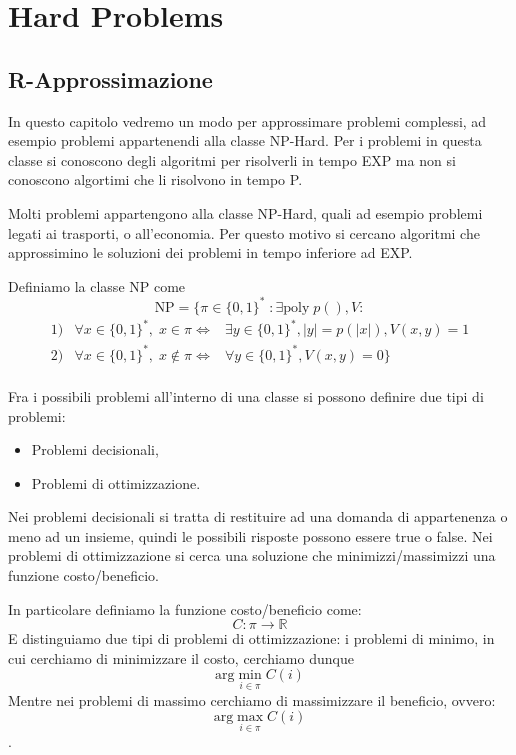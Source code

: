 \documentclass[a4paper,11pt]{book}
\begin{document}

\part{Hard Problems}

\chapter{R-Approssimazione}

In questo capitolo vedremo un modo per approssimare problemi complessi, ad esempio problemi appartenendi alla classe \textsf{NP-Hard}. Per i problemi in questa classe si conoscono degli algoritmi per risolverli in tempo \textsf{EXP} ma non si conoscono algortimi che li risolvono in tempo \textsf{P}.

Molti problemi appartengono alla classe \textsf{NP-Hard}, quali ad esempio problemi legati ai trasporti, o all'economia. Per questo motivo si cercano algoritmi che approssimino le soluzioni dei problemi in tempo inferiore ad \textsf{EXP}.

Definiamo la classe \textsf{NP} come $$\mbox{NP} = \{ \pi \in \{0,1\}^* \; : \exists \mbox{poly} \; p(), V : $$
\begin{eqnarray}
1) & \forall x \in \{0,1\}^*, \;  x \in \pi \Leftrightarrow & \exists y \in \{0,1\}^*, |y| = p(|x|), V(x,y) = 1 \nonumber \\
2) & \forall x \in \{0,1\}^*, \;  x \not\in \pi \Leftrightarrow & \forall y \in \{0,1\}^*, V(x,y) = 0 \nonumber \} \\
\end{eqnarray}

Fra i possibili problemi all'interno di una classe si possono definire due tipi di problemi:
\begin{itemize}
\item Problemi decisionali,
\item Problemi di ottimizzazione.
\end{itemize}

Nei problemi decisionali si tratta di restituire ad una domanda di appartenenza o meno ad un insieme, quindi le possibili risposte possono essere \textsf{true} o \textsf{false}. Nei problemi di ottimizzazione si cerca una soluzione che minimizzi/massimizzi una funzione costo/beneficio.

In particolare definiamo la funzione costo/beneficio come: $$C : \pi \rightarrow \mathbb{R}$$ E distinguiamo due tipi di problemi di ottimizzazione: i problemi di minimo, in cui cerchiamo di minimizzare il costo, cerchiamo dunque $$\mbox{arg} \min_{i \in \pi} C(i)$$ Mentre nei problemi di massimo cerchiamo di massimizzare il beneficio, ovvero: $$\mbox{arg} \max_{i \in \pi} C(i)$$.
\end{document}
